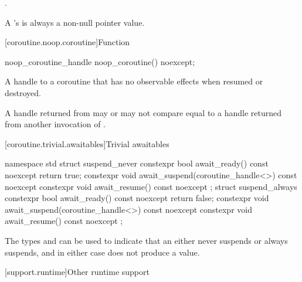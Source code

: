\begin{itemdescr}
\pnum
\returns
{}.

\pnum
\remarks
A 's  is always a
non-null pointer value.
\end{itemdescr}

[coroutine.noop.coroutine]{Function }

%
\begin{itemdecl}
noop_coroutine_handle noop_coroutine() noexcept;
\end{itemdecl}

\begin{itemdescr}
\pnum
\returns
A handle to a coroutine that has no observable effects
when resumed or destroyed.

\pnum
\remarks
A handle returned from  may or may not
compare equal to a handle returned from another invocation
of .
\end{itemdescr}

[coroutine.trivial.awaitables]{Trivial awaitables}

%
%
%
%
%
%
%
%
\begin{codeblock}
namespace std {
  struct suspend_never {
    constexpr bool await_ready() const noexcept { return true; }
    constexpr void await_suspend(coroutine_handle<>) const noexcept {}
    constexpr void await_resume() const noexcept {}
  };
  struct suspend_always {
    constexpr bool await_ready() const noexcept { return false; }
    constexpr void await_suspend(coroutine_handle<>) const noexcept {}
    constexpr void await_resume() const noexcept {}
  };
}
\end{codeblock}

\pnum
\begin{note}
The types  and  can be used
to indicate that an  either never
suspends or always suspends, and in either case does not produce a value.
\end{note}

[support.runtime]{Other runtime support}

